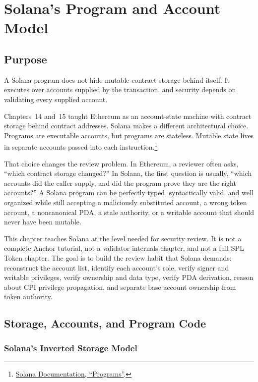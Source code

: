 \chapter{Solana's Program and Account Model}

\section{Purpose}

\begin{principlebox}
A Solana program does not hide mutable contract storage behind itself. It executes over accounts supplied by the transaction, and security depends on validating every supplied account.
\end{principlebox}

Chapters~14 and~15 taught Ethereum as an account-state machine with contract storage behind contract addresses. Solana makes a different architectural choice. Programs are executable accounts, but programs are stateless. Mutable state lives in separate accounts passed into each instruction.\footnote{\href{https://solana.com/docs/core/programs}{Solana Documentation, ``Programs''}.}

That choice changes the review problem. In Ethereum, a reviewer often asks, ``which contract storage changed?'' In Solana, the first question is usually, ``which accounts did the caller supply, and did the program prove they are the right accounts?'' A Solana program can be perfectly typed, syntactically valid, and well organized while still accepting a maliciously substituted account, a wrong token account, a noncanonical PDA, a stale authority, or a writable account that should never have been mutable.

This chapter teaches Solana at the level needed for security review. It is not a complete Anchor tutorial, not a validator internals chapter, and not a full SPL Token chapter. The goal is to build the review habit that Solana demands: reconstruct the account list, identify each account's role, verify signer and writable privileges, verify ownership and data type, verify PDA derivation, reason about CPI privilege propagation, and separate base account ownership from token authority.

\section{Storage, Accounts, and Program Code}

\subsection{Solana's Inverted Storage Model}


